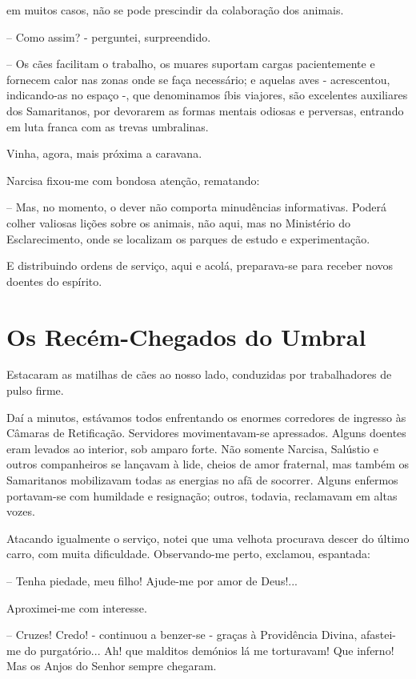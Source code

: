 \documentclass[portuguese,12pt,a4paper]{scrbook}
\begin{document}
	
	em muitos casos, não se pode prescindir da colaboração dos animais.
	
	– Como assim? - perguntei, surpreendido.
	
	– Os cães facilitam o trabalho, os muares suportam cargas pacientemente e fornecem calor nas zonas onde se faça necessário; e aquelas aves - acrescentou, indicando-as no espaço -, que denominamos íbis viajores, são excelentes auxiliares dos Samaritanos, por devorarem as formas mentais odiosas e perversas, entrando em luta franca com as trevas umbralinas.
	
	Vinha, agora, mais próxima a caravana.
	
	Narcisa fixou-me com bondosa atenção, rematando:
	
	– Mas, no momento, o dever não comporta minudências informativas. Poderá colher valiosas lições sobre os animais, não aqui, mas no Ministério do Esclarecimento, onde se localizam os parques de estudo e experimentação.
	
	E distribuindo ordens de serviço, aqui e acolá, preparava-se para receber novos doentes do espírito.
	
	
	\chapter{Os Recém-Chegados do Umbral}
	
	Estacaram as matilhas de cães ao nosso lado, conduzidas por trabalhadores de pulso firme.
	
	Daí a minutos, estávamos todos enfrentando os enormes corredores de ingresso às Câmaras de Retificação. Servidores movimentavam-se apressados. Alguns doentes eram levados ao interior, sob amparo forte. Não somente Narcisa, Salústio e outros companheiros se lançavam à lide, cheios de amor fraternal, mas também os Samaritanos mobilizavam todas as energias no afã de socorrer. Alguns enfermos portavam-se com humildade e resignação; outros, todavia, reclamavam em altas vozes.
	
	Atacando igualmente o serviço, notei que uma velhota procurava descer do último carro, com muita dificuldade. Observando-me perto, exclamou, espantada:
	
	– Tenha piedade, meu filho! Ajude-me por amor de Deus!...
	
	Aproximei-me com interesse.
	
	– Cruzes! Credo! - continuou a benzer-se - graças à Providência Divina, afastei-me do purgatório... Ah! que malditos demónios lá me torturavam! Que inferno! Mas os Anjos do Senhor sempre chegaram.
	
\end{document}
